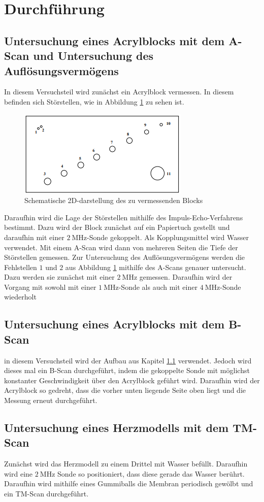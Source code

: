 \section{Durchführung}
\label{sec:Durchführung}

\subsection{Untersuchung eines Acrylblocks mit dem A-Scan und Untersuchung des Auflösungsvermögens} \label{sec:1}
In diesem Versuchsteil wird zunächst ein Acrylblock vermessen. In diesem befinden sich Störstellen, wie in Abbildung \ref{fig:block} zu sehen ist.
\begin{figure}[H]
  \centering
  \includegraphics{Text/Bilder/Block.PNG}
  \caption{Schematische 2D-darstellung des zu vermessenden Blocks \cite[5]{sample}}
  \label{fig:block}
\end{figure}
Daraufhin wird die Lage der Störstellen mithilfe des Impuls-Echo-Verfahrens bestimmt. Dazu wird der Block zunächst auf ein Papiertuch gestellt und daraufhin mit einer
$\SI{2}{\mega\hertz}$-Sonde gekoppelt. Als Kopplungsmittel wird Wasser verwendet.
Mit einem A-Scan wird dann von mehreren Seiten die Tiefe der Störstellen gemessen.
\newline
Zur Untersuchung des Auflösungsvermögens werden die Fehlstellen $1$ und $2$ aus Abbildung \ref{fig:block} mithilfe des A-Scans genauer untersucht.
Dazu werden sie zunächst mit einer $\SI{2}{\mega\hertz}$ gemessen. Daraufhin wird der Vorgang mit sowohl mit einer $\SI{1}{\mega\hertz}$-Sonde als auch mit einer $\SI{4}{\mega\hertz}$-Sonde wiederholt

\subsection{Untersuchung eines Acrylblocks mit dem B-Scan}
in diesem Versuchsteil wird der Aufbau aus Kapitel \ref{sec:1} verwendet. Jedoch wird dieses mal ein B-Scan durchgeführt, indem die gekoppelte Sonde mit möglichst konstanter Geschwindigkeit
über den Acrylblock geführt wird. Daraufhin wird der Acrylblock so gedreht, dass die vorher unten liegende Seite oben liegt und die Messung erneut durchgeführt.

\subsection{Untersuchung eines Herzmodells mit dem TM-Scan}
Zunächst wird das Herzmodell zu einem Drittel mit Wasser befüllt. Daraufhin wird eine $\SI{2}{\mega\hertz}$ Sonde so positioniert, dass diese gerade das Wasser berührt.
Daraufhin wird mithilfe eines Gummiballs die Membran periodisch gewölbt und ein TM-Scan durchgeführt.

